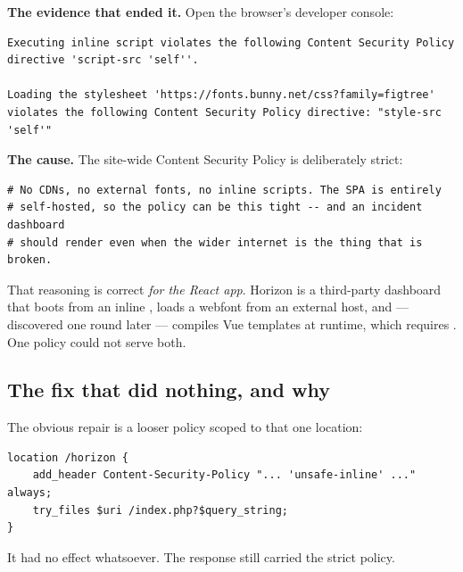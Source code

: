 \textbf{The evidence that ended it.} Open the browser's developer console:

\begin{lstlisting}
Executing inline script violates the following Content Security Policy
directive 'script-src 'self''.

Loading the stylesheet 'https://fonts.bunny.net/css?family=figtree'
violates the following Content Security Policy directive: "style-src 'self'"
\end{lstlisting}

\textbf{The cause.} The site-wide Content Security Policy is deliberately
strict:

\begin{lstlisting}[language=nginxconf]
# No CDNs, no external fonts, no inline scripts. The SPA is entirely
# self-hosted, so the policy can be this tight -- and an incident dashboard
# should render even when the wider internet is the thing that is broken.
\end{lstlisting}

That reasoning is correct \emph{for the React app}. Horizon is a third-party
dashboard that boots from an inline , loads a webfont from an
external host, and --- discovered one round later --- compiles Vue templates at
runtime, which requires . One policy could not serve both.

\subsection{The fix that did nothing, and why}

The obvious repair is a looser policy scoped to that one location:

\begin{lstlisting}[language=nginxconf]
location /horizon {
    add_header Content-Security-Policy "... 'unsafe-inline' ..." always;
    try_files $uri /index.php?$query_string;
}
\end{lstlisting}

It had no effect whatsoever. The response still carried the strict policy.


